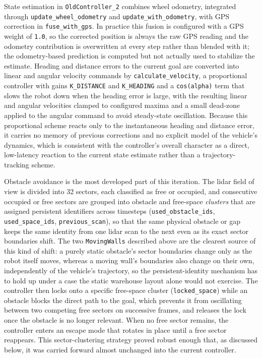 State estimation in \texttt{OldController\_2} combines wheel odometry, integrated through \texttt{update\_wheel\_odometry} and \texttt{update\_with\_odometry}, with GPS correction in \texttt{fuse\_with\_gps}. In practice this fusion is configured with a GPS weight of \texttt{1.0}, so the corrected position is always the raw GPS reading and the odometry contribution is overwritten at every step rather than blended with it; the odometry-based prediction is computed but not actually used to stabilize the estimate. Heading and distance errors to the current goal are converted into linear and angular velocity commands by \texttt{calculate\_velocity}, a proportional controller with gains \texttt{K\_DISTANCE} and \texttt{K\_HEADING} and a \texttt{cos(alpha)} term that slows the robot down when the heading error is large, with the resulting linear and angular velocities clamped to configured maxima and a small dead-zone applied to the angular command to avoid steady-state oscillation. Because this proportional scheme reacts only to the instantaneous heading and distance error, it carries no memory of previous corrections and no explicit model of the vehicle's dynamics, which is consistent with the controller's overall character as a direct, low-latency reaction to the current state estimate rather than a trajectory-tracking scheme.

Obstacle avoidance is the most developed part of this iteration. The lidar field of view is divided into 32 sectors, each classified as free or occupied, and consecutive occupied or free sectors are grouped into obstacle and free-space \emph{clusters} that are assigned persistent identifiers across timesteps (\texttt{used\_obstacle\_ids}, \texttt{used\_space\_ids}, \texttt{previous\_scan}), so that the same physical obstacle or gap keeps the same identity from one lidar scan to the next even as its exact sector boundaries shift. The two \texttt{MovingWalls} described above are the clearest source of this kind of shift: a purely static obstacle's sector boundaries change only as the robot itself moves, whereas a moving wall's boundaries also change on their own, independently of the vehicle's trajectory, so the persistent-identity mechanism has to hold up under a case the static warehouse layout alone would not exercise. The controller then locks onto a specific free-space cluster (\texttt{locked\_space}) while an obstacle blocks the direct path to the goal, which prevents it from oscillating between two competing free sectors on successive frames, and releases the lock once the obstacle is no longer relevant. When no free sector remains, the controller enters an escape mode that rotates in place until a free sector reappears. This sector-clustering strategy proved robust enough that, as discussed below, it was carried forward almost unchanged into the current controller.

